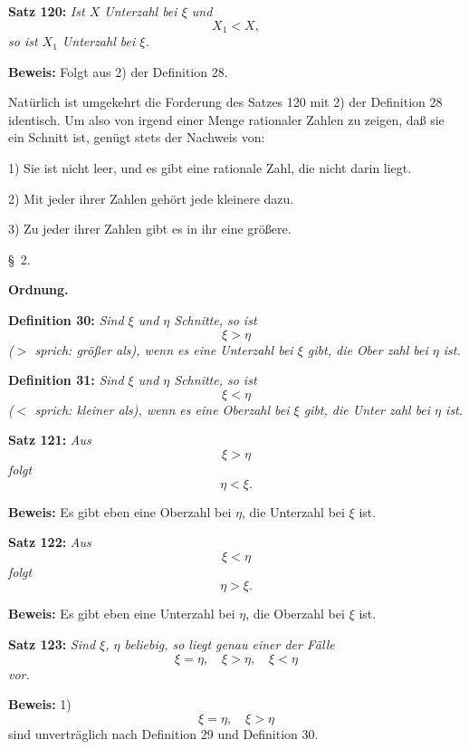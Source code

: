 
{\bf Satz 120:} {\it Ist $X$ Unterzahl bei $\xi$ und
$$X_1 < X,$$
so ist $X_1$ Unterzahl bei $\xi$.}

{\bf Beweis:} Folgt aus 2) der Definition 28.

Nat\"urlich ist umgekehrt die Forderung des Satzes 120 mit
2) der Definition 28 identisch.  Um also von irgend einer Menge
rationaler Zahlen zu zeigen, da{\ss} sie ein Schnitt ist, gen\"ugt stets
der Nachweis von:

1) Sie ist nicht leer, und es gibt eine rationale Zahl, die nicht
darin liegt.

2) Mit jeder ihrer Zahlen geh\"ort jede kleinere dazu.

3) Zu jeder ihrer Zahlen gibt es in ihr eine gr\"o{\ss}ere.
\vfill\eject



\line{}\baselineskip
\centerline{{\S}~2.}
\medskip

\centerline{\bf Ordnung.}
\bigskip

{\bf Definition 30:} {\it Sind $\xi$ und $\eta$ Schnitte, so ist
$$\xi > \eta$$
{\rm ($>$ sprich: gr\"o{\ss}er als),} wenn es eine Unterzahl bei $\xi$ gibt, die Ober%
zahl bei $\eta$ ist.}
\medskip


{\bf Definition 31:} {\it Sind $\xi$ und $\eta$ Schnitte, so ist
$$\xi < \eta$$
{\rm ($<$ sprich: kleiner als),} wenn es eine Oberzahl bei $\xi$ gibt, die Unter%
zahl bei $\eta$ ist.}
\medskip


{\bf Satz 121:} {\it Aus
$$\xi > \eta$$
folgt
$$\eta < \xi.$$}%

{\bf Beweis:} Es gibt eben eine Oberzahl bei $\eta$, die Unterzahl bei
$\xi$ ist.
\medskip


{\bf Satz 122:} {\it Aus
$$\xi < \eta$$
folgt
$$\eta > \xi.$$}%

{\bf Beweis:} Es gibt eben eine Unterzahl bei $\eta$, die Oberzahl bei
$\xi$ ist.
\medskip


{\bf Satz 123:} {\it Sind $\xi$, $\eta$ beliebig, so liegt genau einer der F\"alle
$$\xi = \eta,\quad \xi > \eta,\quad \xi < \eta$$
vor.}

{\bf Beweis:} 1)
$$\xi = \eta,\quad \xi > \eta$$
sind unvertr\"aglich nach Definition 29 und Definition 30.

